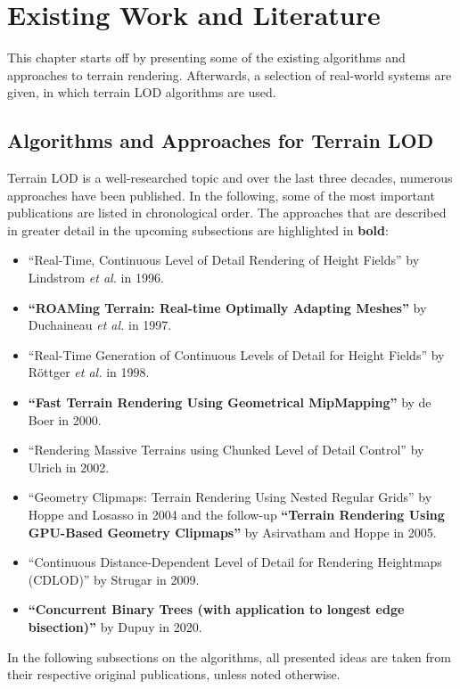 \chapter{Existing Work and Literature}
This chapter starts off by presenting some of the existing algorithms and approaches to terrain rendering.
Afterwards, a selection of real-world systems are given, in which terrain LOD algorithms are used.

\section{Algorithms and Approaches for Terrain LOD}
Terrain LOD is a well-researched topic and over the last three decades, numerous approaches have been published.
In the following, some of the most important publications are listed in chronological order.
The approaches that are described in greater detail in the upcoming subsections are highlighted in \textbf{bold}:
\begin{itemize}
  \item ``Real-Time, Continuous Level of Detail Rendering of Height Fields'' \cite{lindstrom1996} by Lindstrom \textit{et al.} in 1996.
  \item \textbf{``ROAMing Terrain: Real-time Optimally Adapting Meshes''} \cite{roam} by Duchaineau \textit{et al.} in 1997.
  \item ``Real-Time Generation of Continuous Levels of Detail for Height Fields'' \cite{rottgerpaper} by Röttger \textit{et al.} in 1998.
  \item \textbf{``Fast Terrain Rendering Using Geometrical MipMapping''}  \cite{geomipmapping} by de Boer in 2000.
  \item ``Rendering Massive Terrains using Chunked Level of Detail Control'' \cite{chunkedlod} by Ulrich in 2002.
  \item ``Geometry Clipmaps: Terrain Rendering Using Nested Regular Grids'' \cite{geomclipmaps} by Hoppe and Losasso in 2004 and the follow-up \textbf{``Terrain Rendering Using GPU-Based Geometry Clipmaps''} by Asirvatham and Hoppe \cite{gpugeomclipmaps} in 2005.
  \item ``Continuous Distance-Dependent Level of Detail for Rendering Heightmaps (CDLOD)'' \cite{cdlod} by Strugar in 2009.
  \item \textbf{``Concurrent Binary Trees (with application to longest edge bisection)''} \cite{cbt} by Dupuy in 2020.
\end{itemize}
In the following subsections on the algorithms, all presented ideas are taken from their respective original publications,
unless noted otherwise.

